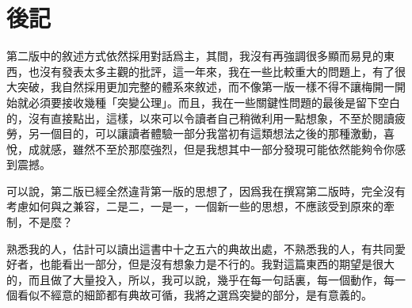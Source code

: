\chapter*{後記}
第二版中的敘述方式依然採用對話爲主，其間，我沒有再強調很多顯而易見的東西，也沒有發表太多主觀的批評，這一年來，我在一些比較重大的問題上，有了很大突破，我自然採用更加完整的體系來敘述，而不像第一版一樣不得不讓梅開一開始就必須要接收幾種「突變公理」。而且，我在一些關鍵性問題的最後是留下空白的，沒有直接點出，這樣，以來可以令讀者自己稍微利用一點想象，不至於閱讀疲勞，另一個目的，可以讓讀者體驗一部分我當初有這類想法之後的那種激動，喜悅，成就感，雖然不至於那麼強烈，但是我想其中一部分發現可能依然能夠令你感到震撼。

可以說，第二版已經全然違背第一版的思想了，因爲我在撰寫第二版時，完全沒有考慮如何與之兼容，二是二，一是一，一個新一些的思想，不應該受到原來的牽制，不是麼？

熟悉我的人，估計可以讀出這書中十之五六的典故出處，不熟悉我的人，有共同愛好者，也能看出一部分，但是沒有想象力是不行的。我對這篇東西的期望是很大的，而且做了大量投入，所以，我可以說，幾乎在每一句話裏，每一個動作，每一個看似不經意的細節都有典故可循，我將之選爲突變的部分，是有意義的。
